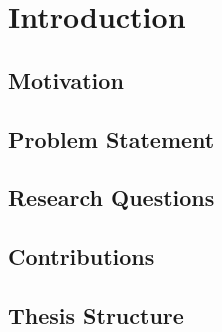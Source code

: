 \chapter{Introduction}
\label{ch:intro}

%
%
\section{Motivation}
\label{sec:intro:motivation}

%
%
\section{Problem Statement}
\label{sec:intro:problem}

%
%
\section{Research Questions}
\label{sec:intro:rq}

%
%
\section{Contributions}
\label{sec:intro:contributions}

%
%
\section{Thesis Structure}
\label{sec:intro:structure}

